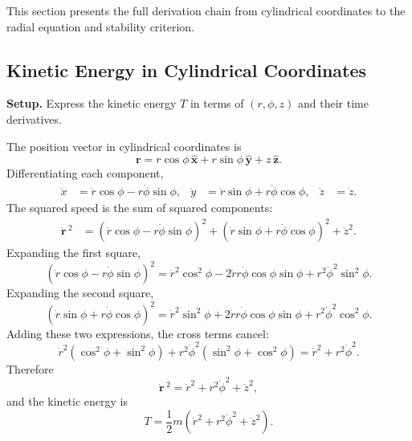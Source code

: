 \documentclass[11pt,letterpaper]{article}
\newcommand{\parhead}[1]{\par\medskip\noindent\textbf{#1}\ignorespaces}
\begin{document}
This section presents the full derivation chain from cylindrical coordinates to the radial equation and stability criterion.

\subsection{Kinetic Energy in Cylindrical Coordinates}
\label{sec:kinematic}

\parhead{Setup.}
Express the kinetic energy $T$ in terms of $(r,\phi,z)$ and their time derivatives.

The position vector in cylindrical coordinates is
\begin{equation}
    \mathbf{r} = r\cos\phi\,\hat{\mathbf{x}} + r\sin\phi\,\hat{\mathbf{y}} + z\,\hat{\mathbf{z}}.
\end{equation}
Differentiating each component,
\begin{align}
    \dot{x} &= \dot{r}\cos\phi - r\dot{\phi}\sin\phi, &
    \dot{y} &= \dot{r}\sin\phi + r\dot{\phi}\cos\phi, &
    \dot{z} &= \dot{z}.
\end{align}
The squared speed is the sum of squared components:
\begin{align}
    \dot{\mathbf{r}}\,^2
    &= (\dot{r}\cos\phi - r\dot{\phi}\sin\phi)^2
     + (\dot{r}\sin\phi + r\dot{\phi}\cos\phi)^2
     + \dot{z}^2.
\end{align}
Expanding the first square,
\begin{equation}
    (\dot{r}\cos\phi - r\dot{\phi}\sin\phi)^2
    = \dot{r}^2\cos^2\phi - 2\dot{r}r\dot{\phi}\cos\phi\sin\phi + r^2\dot{\phi}^2\sin^2\phi.
\end{equation}
Expanding the second square,
\begin{equation}
    (\dot{r}\sin\phi + r\dot{\phi}\cos\phi)^2
    = \dot{r}^2\sin^2\phi + 2\dot{r}r\dot{\phi}\cos\phi\sin\phi + r^2\dot{\phi}^2\cos^2\phi.
\end{equation}
Adding these two expressions, the cross terms cancel:
\begin{equation}
    \dot{r}^2(\cos^2\phi+\sin^2\phi) + r^2\dot{\phi}^2(\sin^2\phi+\cos^2\phi)
    = \dot{r}^2 + r^2\dot{\phi}^2.
\end{equation}
Therefore
\begin{equation}\label{eq:speed2}
    \dot{\mathbf{r}}\,^2 = \dot{r}^2 + r^2\dot{\phi}^2 + \dot{z}^2,
\end{equation}
and the kinetic energy is
\begin{equation}\label{eq:Tfull}
    T = \frac{1}{2}m\left(\dot{r}^2 + r^2\dot{\phi}^2 + \dot{z}^2\right).
\end{equation}
\end{document}
